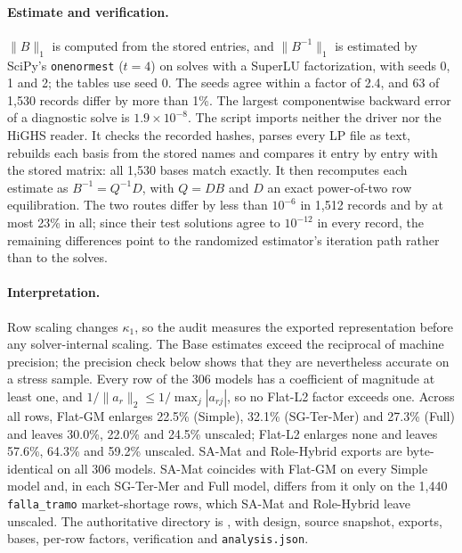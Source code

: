 \documentclass[11pt]{article}
\begin{document}
\paragraph{Estimate and verification.}
$\|B\|_1$ is computed from the stored entries, and $\|B^{-1}\|_1$ is estimated by SciPy's
\texttt{onenormest} ($t=4$) on solves with a SuperLU factorization, with seeds 0, 1 and 2; the
tables use seed 0. The seeds agree within a factor of 2.4, and 63 of 1,530 records differ by more
than 1\%. The largest componentwise backward error of a diagnostic solve is $1.9\times10^{-8}$.
The script  imports neither the driver nor the
HiGHS reader. It checks the recorded hashes, parses every LP file as text, rebuilds each basis
from the stored names and compares it entry by entry with the stored matrix: all 1,530 bases
match exactly. It then recomputes each estimate as $B^{-1}=Q^{-1}D$, with $Q=DB$ and $D$ an exact
power-of-two row equilibration. The two routes differ by less than $10^{-6}$ in 1,512 records and
by at most 23\% in all; since their test solutions agree to $10^{-12}$ in every record, the
remaining differences point to the randomized estimator's iteration path rather than to the
solves.

\begin{table}[tb]
\centering\small
\caption{Fixed-basis audit: per-instance ratios $\kappa_1(\text{policy})/\kappa_1(\text{Base})$ on
the common basis. ``Improved'' counts ratios below one.}\label{tab:si-fixed-basis}

\end{table}

\paragraph{Interpretation.}
Row scaling changes $\kappa_1$, so the audit measures the exported representation before any
solver-internal scaling. The Base estimates exceed the reciprocal of machine precision; the
precision check below shows that they are nevertheless accurate on a stress sample. Every row of the 306 models has a coefficient of magnitude at
least one, and $1/\|a_r\|_2\le1/\max_j|a_{rj}|$, so no Flat-L2 factor exceeds one. Across all
rows, Flat-GM enlarges 22.5\% (Simple), 32.1\% (SG-Ter-Mer) and 27.3\% (Full) and leaves 30.0\%,
22.0\% and 24.5\% unscaled; Flat-L2 enlarges none and leaves 57.6\%, 64.3\% and 59.2\% unscaled.
SA-Mat and Role-Hybrid exports are byte-identical on all 306 models. SA-Mat coincides with
Flat-GM on every Simple model and, in each SG-Ter-Mer and Full model, differs from it only on
the 1,440 \texttt{falla\_tramo} market-shortage rows, which SA-Mat and Role-Hybrid leave
unscaled. The authoritative directory is
, with design, source
snapshot, exports, bases, per-row factors, verification and \texttt{analysis.json}.
\end{document}
